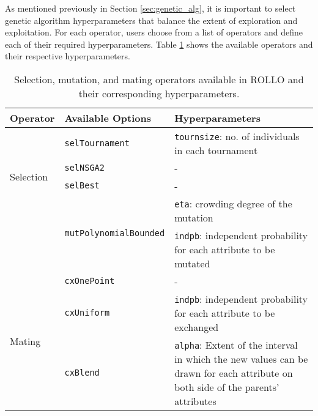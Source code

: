 As mentioned previously in Section \ref{sec:genetic_alg}, it is important to 
select genetic algorithm hyperparameters that balance the extent of exploration 
and exploitation.
For each operator, users choose from a list of operators and define each
of their required hyperparameters. 
Table \ref{tab:deap_operators} shows the available operators and their respective 
hyperparameters. 
\begin{table}[]
    \centering
    \onehalfspacing
    \caption{Selection, mutation, and mating operators available in 
    \acrfull{ROLLO} and their corresponding hyperparameters. }
	\label{tab:deap_operators}
    \footnotesize
    \begin{tabular}{l|p{}|p{}}
    \hline
    \textbf{Operator} & \textbf{Available Options} & \textbf{Hyperparameters} \\ \hline
    \multirow{4}{1cm}{Selection} & \texttt{selTournament} & \texttt{tournsize}: no. of individuals in each tournament\\ \cline{2-3}
    & \texttt{selNSGA2} & - \\ \cline{2-3}
    & \texttt{selBest} & - \\ \hline
    \multirow{2}{1cm}{Mutation} & \multirow{2}{2cm}{\texttt{mutPolynomialBounded}} & \texttt{eta}: crowding degree of the mutation\\  
    && \texttt{indpb}: independent probability for each attribute to be mutated\\ \hline
    \multirow{3}{1cm}{Mating} & \texttt{cxOnePoint} & -\\ \cline{2-3}
    & \texttt{cxUniform} & \texttt{indpb}: independent probability for each attribute to be exchanged\\ \cline{2-3}
    & \texttt{cxBlend} & \texttt{alpha}: Extent of the interval in which the new values can be drawn for each attribute on both side of the parents’ attributes\\ \hline
    \end{tabular}
    \end{table}

